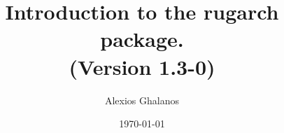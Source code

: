 \documentclass[11pt,a4paper]{article}
\begin{document}
\title{Introduction to the rugarch package.\\
(Version 1.3-0)}
\author{Alexios Ghalanos}
\date{\today}
\maketitle
\tableofcontents
\newpage

\clearpage

\end{document}
